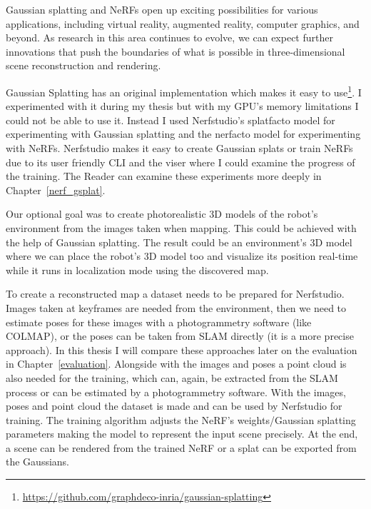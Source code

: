 Gaussian splatting and NeRFs open up exciting possibilities for various applications, including virtual reality, augmented reality, computer graphics, and beyond. As research in this area continues to evolve, we can expect further innovations that push the boundaries of what is possible in three-dimensional scene reconstruction and rendering.

Gaussian Splatting has an original implementation which makes it easy to use\footnote{\url{https://github.com/graphdeco-inria/gaussian-splatting}}. I experimented with it during my thesis but with my GPU's memory limitations I could not be able to use it. Instead I used Nerfstudio's splatfacto model for experimenting with Gaussian splatting and the nerfacto model for experimenting with NeRFs. Nerfstudio makes it easy to create Gaussian splats or train NeRFs due to its user friendly CLI and the viser where I could examine the progress of the training. The Reader can examine these experiments more deeply in Chapter~\ref{nerf_gsplat}.

Our optional goal was to create photorealistic 3D models of the robot's environment from the images taken when mapping. This could be achieved with the help of Gaussian splatting. The result could be an environment's 3D model where we can place the robot's 3D model too and visualize its position real-time while it runs in localization mode using the discovered map.

To create a reconstructed map a dataset needs to be prepared for Nerfstudio. Images taken at keyframes are needed from the environment, then we need to estimate poses for these images with a photogrammetry software (like COLMAP), or the poses can be taken from SLAM directly (it is a more precise approach). In this thesis I will compare these approaches later on the evaluation in Chapter~\ref{evaluation}. Alongside with the images and poses a point cloud is also needed for the training, which can, again, be extracted from the SLAM process or can be estimated by a photogrammetry software. With the images, poses and point cloud the dataset is made and can be used by Nerfstudio for training. The training algorithm adjusts the NeRF's weights/Gaussian splatting parameters making the model to represent the input scene precisely. At the end, a scene can be rendered from the trained NeRF or a splat can be exported from the Gaussians.
